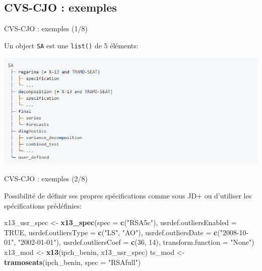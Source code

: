 \documentclass[10pt,xcolor=table,color={dvipsnames,usenames},ignorenonframetext,usepdftitle=false,french]{beamer}
\newenvironment{Shaded}{\begin{snugshade}}{\end{snugshade}}
\newcommand{\DataTypeTok}[1]{\textcolor[rgb]{0.13,0.29,0.53}{#1}}
\newcommand{\DecValTok}[1]{\textcolor[rgb]{0.00,0.00,0.81}{#1}}
\newcommand{\KeywordTok}[1]{\textcolor[rgb]{0.13,0.29,0.53}{\textbf{#1}}}
\newcommand{\NormalTok}[1]{#1}
\newcommand{\OtherTok}[1]{\textcolor[rgb]{0.56,0.35,0.01}{#1}}
\newcommand{\StringTok}[1]{\textcolor[rgb]{0.31,0.60,0.02}{#1}}
\begin{document}
\hypertarget{cvs-cjo-exemples}{%
\subsection{CVS-CJO : exemples}\label{cvs-cjo-exemples}}

\begin{frame}[fragile]{CVS-CJO : exemples (1/8)}
\protect\hypertarget{cvs-cjo-exemples-18}{}

Un object \texttt{SA} est une \texttt{list()} de 5 éléments:

\includegraphics{img/sa_obj_struct.png}

\end{frame}

\begin{frame}[fragile]{CVS-CJO : exemples (2/8)}
\protect\hypertarget{cvs-cjo-exemples-28}{}

Possibilité de définir ses propres spécifications comme sous JD+ ou
d'utiliser les spécifications prédéfinies:

\footnotesize

\begin{Shaded}
\begin{Highlighting}[]
\NormalTok{x13_usr_spec <-}\StringTok{ }\KeywordTok{x13_spec}\NormalTok{(}\DataTypeTok{spec =} \KeywordTok{c}\NormalTok{(}\StringTok{"RSA5c"}\NormalTok{),}
                             \DataTypeTok{usrdef.outliersEnabled =} \OtherTok{TRUE}\NormalTok{,}
                             \DataTypeTok{usrdef.outliersType =} \KeywordTok{c}\NormalTok{(}\StringTok{"LS"}\NormalTok{, }\StringTok{"AO"}\NormalTok{),}
                             \DataTypeTok{usrdef.outliersDate =} \KeywordTok{c}\NormalTok{(}\StringTok{"2008-10-01"}\NormalTok{,}
                                                     \StringTok{"2002-01-01"}\NormalTok{),}
                             \DataTypeTok{usrdef.outliersCoef =} \KeywordTok{c}\NormalTok{(}\DecValTok{36}\NormalTok{, }\DecValTok{14}\NormalTok{),}
                             \DataTypeTok{transform.function =} \StringTok{"None"}\NormalTok{)}
\NormalTok{x13_mod <-}\StringTok{ }\KeywordTok{x13}\NormalTok{(ipch_benin, x13_usr_spec)}
\NormalTok{ts_mod <-}\StringTok{ }\KeywordTok{tramoseats}\NormalTok{(ipch_benin, }\DataTypeTok{spec =} \StringTok{"RSAfull"}\NormalTok{)}
\end{Highlighting}
\end{Shaded}

\end{frame}
\end{document}
